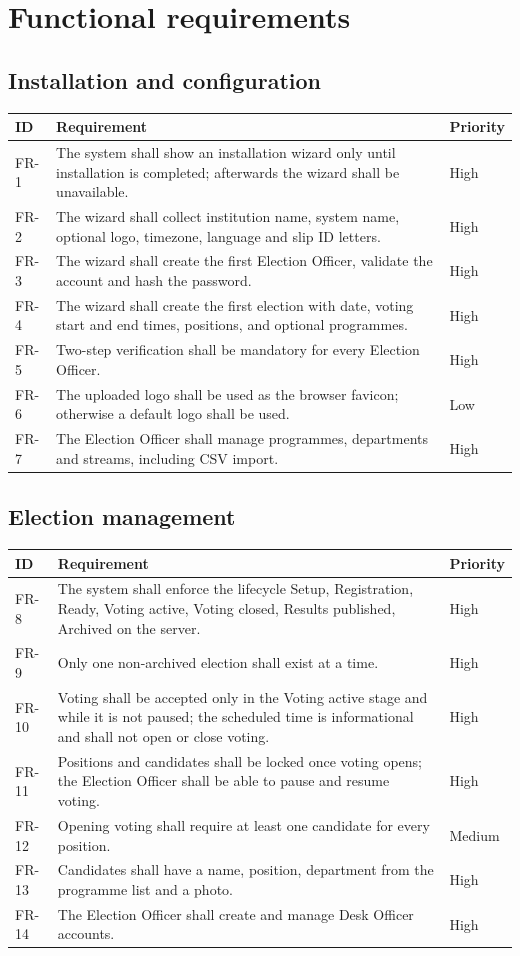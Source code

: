 \section{Functional requirements}

\newcommand{\req}[3]{#1 & #2 & #3 \\}

\subsection{Installation and configuration}
\begin{center}
\small
\begin{tabularx}{\linewidth}{@{}l X l@{}}
\toprule
\textbf{ID} & \textbf{Requirement} & \textbf{Priority} \\
\midrule
\req{FR-1}{The system shall show an installation wizard only until installation is completed; afterwards the wizard shall be unavailable.}{High}
\req{FR-2}{The wizard shall collect institution name, system name, optional logo, timezone, language and slip ID letters.}{High}
\req{FR-3}{The wizard shall create the first Election Officer, validate the account and hash the password.}{High}
\req{FR-4}{The wizard shall create the first election with date, voting start and end times, positions, and optional programmes.}{High}
\req{FR-5}{Two-step verification shall be mandatory for every Election Officer.}{High}
\req{FR-6}{The uploaded logo shall be used as the browser favicon; otherwise a default logo shall be used.}{Low}
\req{FR-7}{The Election Officer shall manage programmes, departments and streams, including CSV import.}{High}
\bottomrule
\end{tabularx}
\end{center}

\subsection{Election management}
\begin{center}
\small
\begin{tabularx}{\linewidth}{@{}l X l@{}}
\toprule
\textbf{ID} & \textbf{Requirement} & \textbf{Priority} \\
\midrule
\req{FR-8}{The system shall enforce the lifecycle Setup, Registration, Ready, Voting active, Voting closed, Results published, Archived on the server.}{High}
\req{FR-9}{Only one non-archived election shall exist at a time.}{High}
\req{FR-10}{Voting shall be accepted only in the Voting active stage and while it is not paused; the scheduled time is informational and shall not open or close voting.}{High}
\req{FR-11}{Positions and candidates shall be locked once voting opens; the Election Officer shall be able to pause and resume voting.}{High}
\req{FR-12}{Opening voting shall require at least one candidate for every position.}{Medium}
\req{FR-13}{Candidates shall have a name, position, department from the programme list and a photo.}{High}
\req{FR-14}{The Election Officer shall create and manage Desk Officer accounts.}{High}
\bottomrule
\end{tabularx}
\end{center}

